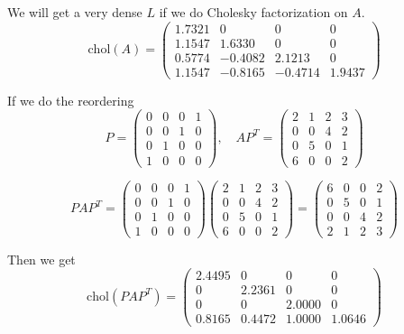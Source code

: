 We will get a very dense $L$ if we do Cholesky factorization on $A$.
\[
    \text{chol}(A)
    =
    \begin{pmatrix}
        1.7321 &        0 &        0  &     0\\
        1.1547 &   1.6330 &        0  &     0\\
        0.5774 &  -0.4082 &   2.1213  &     0\\
        1.1547 &  -0.8165 &  -0.4714  &1.9437
    \end{pmatrix}
\]

If we do the reordering
\[
    P = \begin{pmatrix}
        0 & 0 & 0 & 1 \\
0 & 0 & 1 & 0 \\
0 & 1 & 0 & 0 \\
1 & 0 & 0 & 0  
    \end{pmatrix}, \quad AP^T = \begin{pmatrix}
        2 & 1 & 2 & 3 \\
  0 & 0 & 4 & 2 \\
  0 & 5 & 0 & 1 \\
  6 & 0 & 0 & 2
    \end{pmatrix}
\]

\[
PAP^T = 
\begin{pmatrix}
0 & 0 & 0 & 1 \\
0 & 0 & 1 & 0 \\
0 & 1 & 0 & 0 \\
1 & 0 & 0 & 0  
\end{pmatrix}
\begin{pmatrix}
  2 & 1 & 2 & 3 \\
  0 & 0 & 4 & 2 \\
  0 & 5 & 0 & 1 \\
  6 & 0 & 0 & 2
\end{pmatrix} =
\begin{pmatrix}
  6 & 0 & 0 & 2 \\
  0 & 5 & 0 & 1 \\
  0 & 0 & 4 & 2 \\
  2 & 1 & 2 & 3
\end{pmatrix}
\]

Then we get \[
\text{chol}(PAP^T) = \begin{pmatrix}
    2.4495 &        0&         0&         0\\
         0 &   2.2361&         0&         0\\
         0 &        0&    2.0000&         0\\
    0.8165 &   0.4472&    1.0000&    1.0646
\end{pmatrix}
\]

